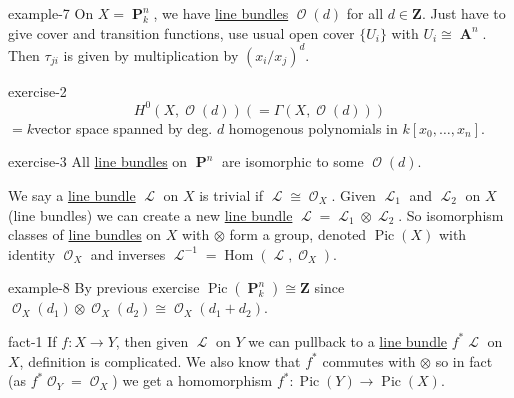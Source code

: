 \documentclass[10pt,]{book}
\numberwithin{equation}{section}
\newcommand{\sheaf}[1]{\operatorname{\mathcal{#1}}}
\newcommand{\ZZ}{\mathbf{Z}}
\DeclareMathOperator{\Hom}{Hom}
\DeclareMathOperator{\Pic}{Pic}
\DeclareMathOperator{\aff}{\mathbf{A}}
\DeclareMathOperator{\PP}{\mathbf{P}}
\begin{document}
\begin{example}{}{example-7}%
\hypertarget{p-112}{}%
On \(X = \PP^n_k\), we have \hyperref[def-line-bundle]{line bundles} \(\sheaf O(d)\) for all \(d\in \ZZ\). Just have to give cover and transition functions, use usual open cover \(\{U_i\}\) with \(U_i\cong \aff^n\). Then \(\tau_{ji}\) is given by multiplication by \((x_i/x_j)^d\).%
\end{example}
\begin{inlineexercise}{}{exercise-2}%
\hypertarget{p-113}{}%
%
\begin{equation*}
H^0(X,\sheaf O(d)) ( = \Gamma (X,\sheaf O(d)))
\end{equation*}
\(= k\)vector space spanned by deg. \(d\) homogenous polynomials  in \(k[x_0,\ldots, x_n]\).%
\end{inlineexercise}
\begin{inlineexercise}{}{exercise-3}%
\hypertarget{p-114}{}%
All \hyperref[def-line-bundle]{line bundles} on \(\PP^n\) are isomorphic to some \(\sheaf O(d)\).%
\end{inlineexercise}
\hypertarget{p-115}{}%
We say a \hyperref[def-line-bundle]{line bundle} \(\sheaf L\) on \(X\) is trivial if \(\sheaf L \cong \sheaf O_X\). Given \(\sheaf L_1\) and \(\sheaf L_2\) on \(X\) (line bundles) we can create a new \hyperref[def-line-bundle]{line bundle} \(\sheaf L = \sheaf L_1 \otimes \sheaf L_2\). So isomorphism classes of \hyperref[def-line-bundle]{line bundles} on \(X\) with \(\otimes\) form a group, denoted \(\Pic(X)\) with identity \(\sheaf O_X\) and inverses \(\sheaf L^{-1} = \Hom(\sheaf L , \sheaf O_X)\).%
\begin{example}{}{example-8}%
\hypertarget{p-116}{}%
By previous exercise \(\Pic(\PP_k^n) \cong \ZZ\) since \(\sheaf O_X(d_1) \otimes \sheaf O_X(d_2)  \cong \sheaf O_X(d_1+d_2)\).%
\end{example}
\begin{fact}{}{}{fact-1}%
\hypertarget{p-117}{}%
If \(f\colon X \to Y\), then given \(\sheaf L\) on \(Y\) we can pullback to a \hyperref[def-line-bundle]{line bundle} \(f^* \sheaf L\) on \(X\), definition is complicated. We also know that \(f^*\) commutes with \(\otimes\) so in fact (as \(f^*\sheaf O_Y = \sheaf O_X\)) we get a homomorphism \(f^* \colon \Pic(Y) \to \Pic(X)\).%
\end{fact}
%
%
\typeout{************************************************}
\typeout{************************************************}
%
\end{document}
